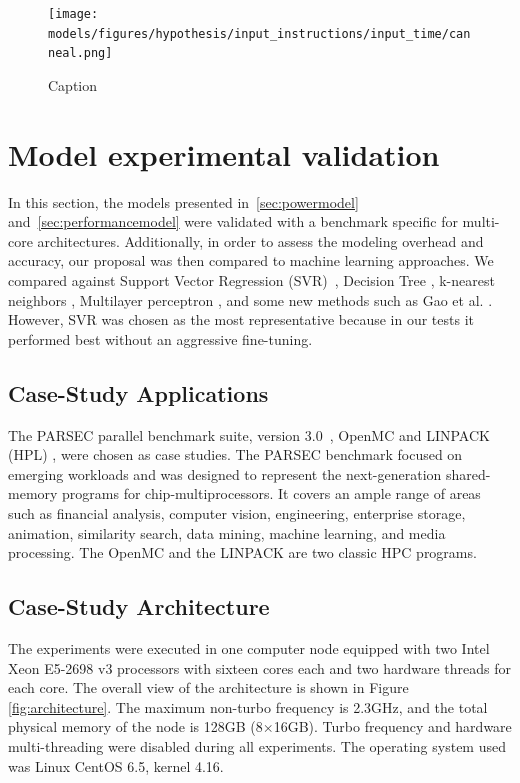 \begin{figure}[H]
	\centering
	\texttt{[image: models/figures/hypothesis/input\_instructions/input\_time/canneal.png]}
	\caption{Caption}
	\label{fig:my_label}
\end{figure}

\section{Model experimental validation} \label{sec:experimentalvalidation}
In this section, the models presented in~\cref{sec:powermodel} and~\cref{sec:performancemodel} were validated with a benchmark specific for multi-core architectures. Additionally, in order to assess the modeling overhead and accuracy, our proposal was then compared to machine learning approaches. We compared against Support Vector Regression (SVR)~\cite{Smola2004}, Decision Tree \cite{Kitts2006RegressionLecture}, k-nearest neighbors \cite{Altman1992AnRegression}, Multilayer perceptron \cite{Murtagh1991MultilayerRegression}, and some new methods such as Gao et al. \cite{Gao2019DendriticPrediction}. However, SVR was chosen as the most representative because in our tests it performed best without an aggressive fine-tuning.

\subsection{Case-Study Applications} \label{sec:casestudyapplication}
The PARSEC parallel benchmark suite, version 3.0~\cite{Bienia2008}, OpenMC \cite{Romano2015OpenMC:Development} and LINPACK (HPL) \cite{Dongarra1988TheExplanation}, were chosen as case studies. The PARSEC benchmark focused on emerging workloads and was designed to represent the next-generation shared-memory programs for chip-multiprocessors. It covers an ample range of areas such as financial analysis, computer vision, engineering, enterprise storage, animation, similarity search, data mining, machine learning, and media processing. The OpenMC and the LINPACK are two classic HPC programs.

\subsection{Case-Study Architecture} \label{sec:casestudyarchitecture}
The experiments were executed in one computer node equipped with two Intel Xeon E5-2698 v3 processors with sixteen cores each and two hardware threads for each core. The overall view of the architecture is shown in Figure \ref{fig:architecture}. The maximum non-turbo frequency is 2.3GHz, and the total physical memory of the node is 128GB (8$\times$16GB). Turbo frequency and hardware multi-threading were disabled during all experiments. The operating system used was Linux CentOS 6.5, kernel 4.16. 

